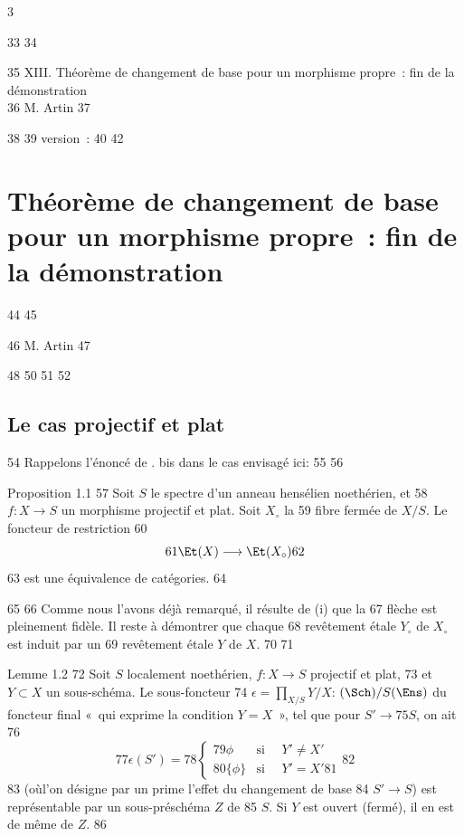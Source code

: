 3	\documentclass[10pt]{../fichiers-configuration-latex/smfart}
\begin{document}
    33	
    34	\begin{center}
    35	XIII. Théorème de changement de base pour un morphisme propre : fin de la démonstration\\
    36	M. Artin 
    37	\end{center}
    38	
    39	version : \showgitstatus{}
    40		
    42		\chapter{Théorème de changement de base pour un morphisme propre : fin de la démonstration}
    44	%
    45	\begin{center}
    46	M. Artin 
    47	\end{center}
    48		
    50	\setcounter{pageoriginal}{131}
    51	
    52	\section{Le cas projectif et plat}	
    54	Rappelons l'énoncé de . bis dans le cas envisagé ici:
    55	
    56	\begin{enonce*}{Proposition 1.1}
    57	Soit $S$ le spectre d'un anneau hensélien noethérien, et
    58	$f:X\rightarrow S$ un morphisme projectif et plat. Soit $X_{\circ}$ la
    59	fibre fermée de $X/S$. Le foncteur de restriction
    60	$$
    61	\Et(X)\longrightarrow \Et(X_{\circ})
    62	$$
    63	est une équivalence de catégories.
    64	\end{enonce*}
    65	
    66	Comme nous l'avons déjà remarqué, il résulte de  (i) que la
    67	flèche est pleinement fidèle. Il reste à démontrer que chaque
    68	revêtement étale $Y_{\circ}$ de $X_{\circ}$ est induit par un
    69	revêtement étale $Y$ de $X$.
    70	
    71	\begin{enonce*}{Lemme 1.2}
    72	Soit $S$ localement noethérien, $f:X\rightarrow S$ projectif et plat,
    73	et $Y\subset X$ un sous-schéma. Le sous-foncteur
    74	$\epsilon=\prod_{X/S}Y/X$: $(\Sch)/S(\Ens)$ du foncteur final « qui exprime la condition $Y=X$ », \ie tel que pour $S'\rightarrow
    75	S$, on ait
    76	$$
    77	\epsilon(S')=
    78	\begin{cases}
    79	\phi & \mbox{si }\quad Y'\neq X'\\
    80	\{\phi\} &\mbox{si }\quad Y'=X'
    81	\end{cases}
    82	$$
    83	(où\pageoriginale l'on désigne par un prime l'effet du changement de base
    84	$S'\rightarrow S$) est représentable par un sous-préschéma $Z$ de
    85	$S$. Si $Y$ est ouvert (\resp fermé), il en est de même de $Z$.
    86	\end{enonce*}
\end{document}
